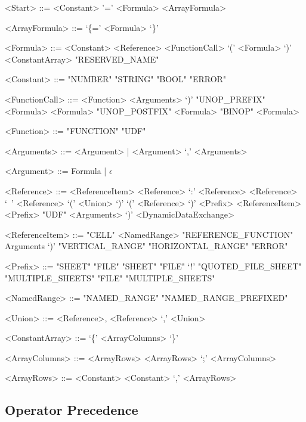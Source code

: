 \documentclass[conference]{IEEEtran}
\begin{document}
\begin{grammar}
<Start> ::= <Constant>
	\alt '=' <Formula>
	\alt <ArrayFormula>
	
<ArrayFormula> ::= `\{=' <Formula> `\}'

<Formula> ::= <Constant>
         \alt <Reference>
         \alt <FunctionCall>
         \alt `(' <Formula> `)'
         \alt <ConstantArray>
         \alt "RESERVED_NAME"
         
<Constant> ::= "NUMBER"
         \alt "STRING"
         \alt "BOOL"
         \alt "ERROR"
         
<FunctionCall> ::= <Function> <Arguments> `)'
		\alt "UNOP_PREFIX" <Formula>
		\alt <Formula> "UNOP_POSTFIX"
		\alt <Formula> "BINOP" <Formula>

<Function> ::= "FUNCTION"
	\alt "UDF"
	
<Arguments> ::= <Argument> | <Argument> `,' <Arguments>

<Argument> ::= Formula | $\epsilon$

%
%
%
%




<Reference> ::= <ReferenceItem>
	\alt <Reference> `:' <Reference>
	\alt <Reference> `\ ' <Reference>
	\alt `(' <Union> `)'
	\alt `(' <Reference> `)' 
	\alt <Prefix> <ReferenceItem>
    \alt <Prefix> "UDF" <Arguments> `)'
    \alt <DynamicDataExchange>
    
<ReferenceItem> ::= "CELL"
	\alt <NamedRange>
	\alt "REFERENCE_FUNCTION" Arguments `)'
	\alt "VERTICAL_RANGE"
	\alt "HORIZONTAL_RANGE"
	\alt "ERROR"
	
<Prefix> ::= "SHEET"
	\alt "FILE" "SHEET"
	\alt "FILE" `!'
	\alt "QUOTED_FILE_SHEET"
	\alt "MULTIPLE_SHEETS"
	\alt "FILE" "MULTIPLE_SHEETS"
	
<NamedRange> ::= "NAMED_RANGE"
            \alt "NAMED_RANGE_PREFIXED"

<Union> ::= <Reference>,
	\alt <Reference> `,' <Union>

<ConstantArray> ::= `\{' <ArrayColumns> `\}'

<ArrayColumns> ::= <ArrayRows>
	\alt <ArrayRows> `;' <ArrayColumns>

<ArrayRows> ::= <Constant>
	\alt <Constant> `,' <ArrayRows>

\end{grammar}

\subsection{Operator Precedence}
\end{document}

